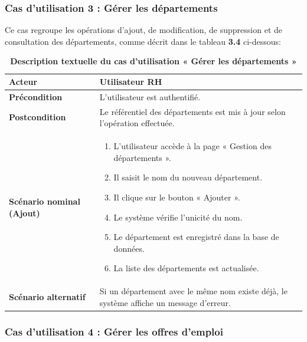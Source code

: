 \documentclass[12pt,a4paper,oneside]{report}
\begin{document}
\begin{itemize}
\begin{longtable}{|p{3.5cm}|p{11cm}|}
\end{longtable}

\subsubsection*{Cas d'utilisation 3 : Gérer les départements}

Ce cas regroupe les opérations d'ajout, de modification, de suppression et de consultation des départements, comme décrit dans le tableau \textbf{3.4} ci-dessous:

\begin{longtable}{|p{3.5cm}|p{11cm}|}
\caption{\textbf{Description textuelle du cas d'utilisation « Gérer les départements »}}
\label{tab:uc-departments}
\hline
\textbf{Acteur} & Utilisateur RH \\ \hline
\textbf{Précondition} & L'utilisateur est authentifié. \\ \hline
\textbf{Postcondition} & Le référentiel des départements est mis à jour selon l'opération effectuée. \\ \hline

\textbf{Scénario nominal (Ajout)} & 
\begin{enumerate}[nosep, leftmargin=*, after=\vspace{-\baselineskip}, before=\vspace{0mm}]
    \item L'utilisateur accède à la page « Gestion des départements ».
    \item Il saisit le nom du nouveau département.
    \item Il clique sur le bouton « Ajouter ».
    \item Le système vérifie l'unicité du nom.
    \item Le département est enregistré dans la base de données.
    \item La liste des départements est actualisée.
    \vspace{0.5cm}
\end{enumerate} \\ \hline

\textbf{Scénario alternatif} & 
Si un département avec le même nom existe déjà, le système affiche un message d'erreur. \\ \hline

\end{longtable}

\subsubsection*{Cas d'utilisation 4 : Gérer les offres d'emploi}


\end{itemize}
\end{document}
